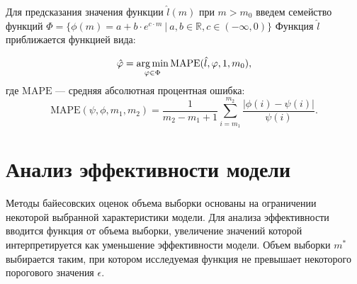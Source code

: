 \documentclass[12pt,twoside]{article}
\begin{document}
Для предсказания значения функции $\hat{l}(m)$ при $m > m_0$ введем семейство функций $\Phi = \{\phi(m) =  a + b\cdot e^{c \cdot m} ~|~ a, b \in \mathbb{R}, c \in (-\infty, 0)\}$
Функция $\hat{l}$ приближается функцией вида:

\begin{equation}\label{argmin_MAPE}
\hat{\phi} =  \argmin_{\phi \in \Phi}\text{MAPE}(\hat{l}, \phi, 1, m_0),
\end{equation}
где $\text{MAPE}$ --- средняя абсолютная процентная ошибка:
\begin{equation}\label{MAPE}
\text{MAPE}(\psi, \phi, m_1, m_2) = \frac{1}{m_2 - m_1 + 1}\sum_{i=m_1}^{m_2}\frac{|\phi(i) - \psi(i)|}{\psi(i)}.
\end{equation}












\section{Анализ эффективности модели}

Методы байесовских оценок объема выборки основаны на ограничении некоторой выбранной характеристики модели. Для анализа эффективности вводится функция от объема выборки, увеличение значений которой интерпретируется как уменьшение эффективности модели. Объем выборки $m^{*}$ выбирается таким, при котором исследуемая функция не превышает некоторого порогового значения $\epsilon$.
\end{document}
